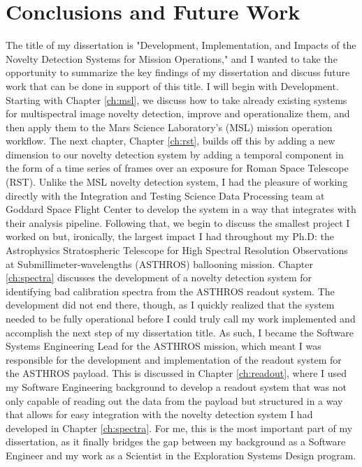 \chapter{Conclusions and Future Work}
\label{ch:conclusion}
The title of my dissertation is  "Development, Implementation, and Impacts of the Novelty Detection Systems for Mission Operations," and I wanted to take the opportunity to summarize the key findings of my dissertation and discuss future work that can be done in support of this title. 
I will begin with Development. 
Starting with Chapter \ref{ch:msl}, we discuss how to take already existing systems for multispectral image novelty detection, improve and operationalize them, and then apply them to the Mars Science Laboratory's (MSL) mission operation workflow.
The next chapter, Chapter \ref{ch:rst}, builds off this by adding a new dimension to our novelty detection system by adding a temporal component in the form of a time series of frames over an exposure for Roman Space Telescope (RST).
Unlike the MSL novelty detection system, I had the pleasure of working directly with the Integration and Testing Science Data Processing team at Goddard Space Flight Center to develop the system in a way that integrates with their analysis pipeline.
Following that, we begin to discuss the smallest project I worked on but, ironically, the largest impact I had throughout my Ph.D: the Astrophysics Stratospheric Telescope for High Spectral Resolution Observations at Submillimeter-wavelengths (ASTHROS) ballooning mission. 
Chapter \ref{ch:spectra} discusses the development of a novelty detection system for identifying bad calibration spectra from the ASTHROS readout system.
The development did not end there, though, as I quickly realized that the system needed to be fully operational before I could truly call my work implemented and accomplish the next step of my dissertation title.
As such, I became the Software Systems Engineering Lead for the ASTHROS mission, which meant I was responsible for the development and implementation of the readout system for the ASTHROS payload.
This is discussed in Chapter \ref{ch:readout}, where I used my Software Engineering background to develop a readout system that was not only capable of reading out the data from the payload but structured in a way that allows for easy integration with the novelty detection system I had developed in Chapter \ref{ch:spectra}.
For me, this is the most important part of my dissertation, as it finally bridges the gap between my background as a Software Engineer and my work as a Scientist in the Exploration Systems Design program.

